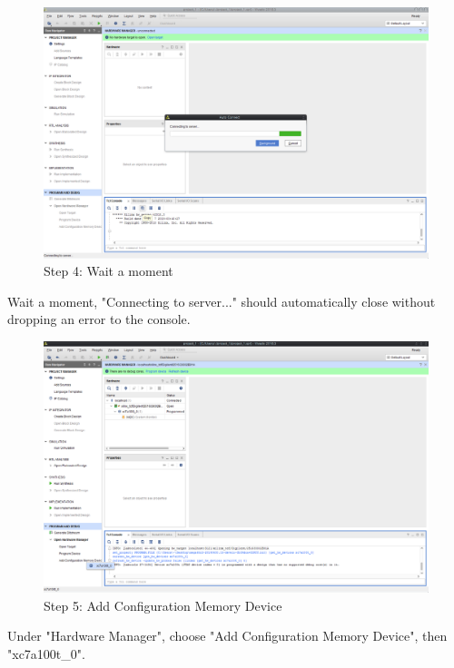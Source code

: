 \begin{figure}
  \includegraphics[width=\linewidth]{images/vivado04.png}
  \caption{Step 4: Wait a moment}
  \label{fig:vivado04}
\end{figure}

Wait a moment, "Connecting to server..."  should automatically close without dropping an error to the console.

\begin{figure}
  \includegraphics[width=\linewidth]{images/vivado05.png}
  \caption{Step 5: Add Configuration Memory Device}
  \label{fig:vivado05}
\end{figure}

Under "Hardware Manager", choose "Add Configuration Memory Device", then "xc7a100t_0".

